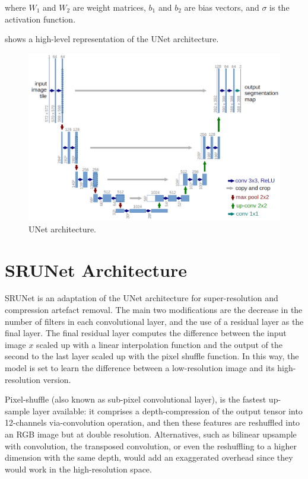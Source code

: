 where $W_1$ and $W_2$ are weight matrices, $b_1$ and $b_2$ are bias vectors, and $\sigma$ is the activation function.

 shows a high-level representation of the UNet architecture.

\begin{figure}[ht]
\centering
\includegraphics[width=1.0\textwidth]{static/unet_architecture.png}
\caption{UNet architecture.}
\label{fig:unet}
\end{figure}

\section{SRUNet Architecture}
\label{sec:srunet}

SRUNet is an adaptation of the UNet architecture for super-resolution and compression artefact removal. The main two modifications are the decrease in the number of filters in each convolutional layer, and the use of a residual layer as the final layer.
The final residual layer computes the difference between the input image $x$ scaled up with a linear interpolation function and the output of the second to the last layer scaled up with the pixel shuffle function. In this way, the model is set to learn the difference between a low-resolution image and its high-resolution version.

Pixel-shuffle (also known as sub-pixel convolutional layer), is the fastest up-sample layer available: it comprises a depth-compression of the output tensor into 12-channels via-convolution operation, and then these features are reshuffled into an RGB image but at double resolution. Alternatives, such as bilinear upsample with convolution, the transposed convolution, or even the reshuffling to a higher dimension with the same depth, would add an exaggerated overhead since they would work in the high-resolution space.

